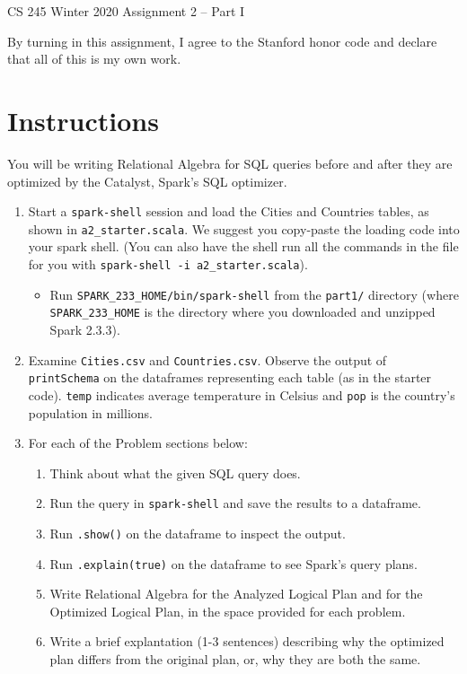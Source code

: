 \documentclass[12pt]{article}
\begin{document}
\begin{center}
{\Large CS 245 Winter 2020 Assignment 2 -- Part I}
\end{center}

By turning in this assignment, I agree to the Stanford honor code and declare
that all of this is my own work.

\section*{Instructions}
You will be writing Relational Algebra for SQL queries before and after
they are optimized by the Catalyst, Spark's SQL optimizer.

\begin{enumerate}
    \item Start a \texttt{spark-shell} session and load the Cities and Countries
        tables, as shown in \texttt{a2\_starter.scala}.
        We suggest you copy-paste the loading code into your spark shell.
        (You can also have the shell run all the commands in the file
        for you with \texttt{spark-shell -i a2\_starter.scala}).
    \begin{itemize}
        \item Run \texttt{SPARK\_233\_HOME/bin/spark-shell}
        from the \texttt{part1/} directory
        (where \\
        \texttt{SPARK\_233\_HOME} is the directory where you
        downloaded and unzipped Spark 2.3.3).

    \end{itemize}

    \item Examine \texttt{Cities.csv} and \texttt{Countries.csv}.
        Observe the output of \texttt{printSchema} on the dataframes
        representing each table (as in the starter code).
        \texttt{temp} indicates average temperature in Celsius and
        \texttt{pop} is the country's population in millions.
    \item For each of the Problem sections below:
    \begin{enumerate}
        \item Think about what the given SQL query does.
        \item Run the query in \texttt{spark-shell} and save the results to a dataframe.
        \item Run \texttt{.show()} on the dataframe to inspect the output.
        \item Run \texttt{.explain(true)} on the dataframe to see Spark's
            query plans.
        \item Write Relational Algebra for the Analyzed Logical Plan
            and for the Optimized Logical Plan, in the space provided
            for each problem.
        \item Write a brief explantation (1-3 sentences) describing why the optimized
            plan differs from the original plan, or, why they are both the same.
    \end{enumerate}
\end{enumerate}
\end{document}
